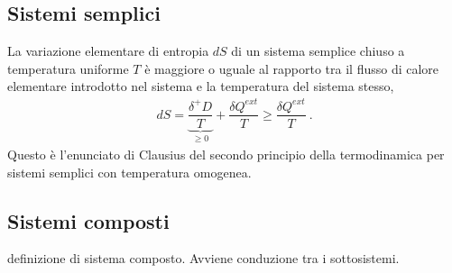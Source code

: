 \documentclass[letterpaper,10pt,italian]{jupyterBook}
\begin{document}
\subsection{Sistemi semplici}
\label{\detokenize{ch/thermodynamics/principles-second:sistemi-semplici}}\label{\detokenize{ch/thermodynamics/principles-second:physics-hs-thermodynamics-principles-second-simple}}
\sphinxAtStartPar
La variazione elementare di entropia \(d S\) di un sistema semplice chiuso a temperatura uniforme \(T\) è maggiore o uguale al rapporto tra il flusso di calore elementare introdotto nel sistema e la temperatura del sistema stesso,
\begin{equation*}
\begin{split}dS = \underbrace{\dfrac{\delta^+ D}{T}}_{\ge 0} + \dfrac{\delta Q^{ext}}{T} \ge \dfrac{\delta Q^{ext}}{T} \ .\end{split}
\end{equation*}
\sphinxAtStartPar
Questo è l’enunciato di Clausius del secondo principio della termodinamica per sistemi semplici con temperatura omogenea.


\subsection{Sistemi composti}
\label{\detokenize{ch/thermodynamics/principles-second:sistemi-composti}}\label{\detokenize{ch/thermodynamics/principles-second:physics-hs-thermodynamics-principles-second-composite}}
\sphinxAtStartPar
{} definizione di sistema composto. Avviene conduzione tra i sotto\sphinxhyphen{}sistemi.
\end{document}
